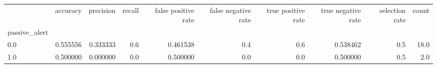 \begin{tabular}{lrrrrrrrrr}
\toprule
{} &  accuracy &  precision &  recall &  false positive rate &  false negative rate &  true positive rate &  true negative rate &  selection rate &  count \\
passive\_alert &           &            &         &                      &                      &                     &                     &                 &        \\
\midrule
0.0           &  0.555556 &   0.333333 &     0.6 &             0.461538 &                  0.4 &                 0.6 &            0.538462 &             0.5 &   18.0 \\
1.0           &  0.500000 &   0.000000 &     0.0 &             0.500000 &                  0.0 &                 0.0 &            0.500000 &             0.5 &    2.0 \\
\bottomrule
\end{tabular}
